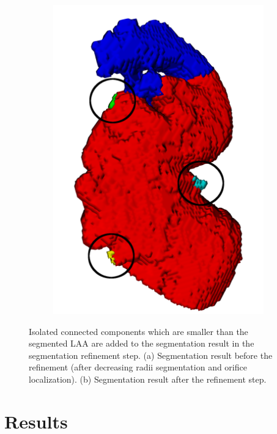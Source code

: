 \documentclass[review]{elsarticle}
\begin{document}
\begin{figure}[t]
\begin{subfigure}[b]{.25\linewidth}
    \includegraphics[width=\textwidth]{fig10b.png}
    \caption{}%
    \label{fig:refinement_added} 
  \end{subfigure}
  \caption{Isolated connected components which are smaller than the segmented LAA are added to the segmentation result in the segmentation refinement step. (a) Segmentation result before the refinement (after decreasing radii segmentation and orifice localization). (b) Segmentation result after the refinement step. }
  \label{fig:refinement_figure}
\end{figure}




\section{Results}
\label{sec:results}
\end{document}
